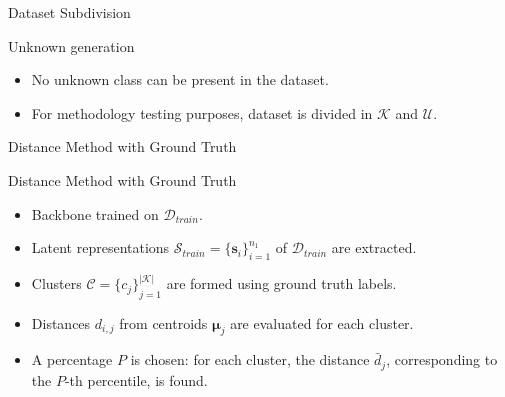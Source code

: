 \begin{frame}{Dataset Subdivision}
    \begin{normalblock}{Unknown generation}
        \begin{itemize}
          \item No unknown class can be present in the dataset.
          \item For methodology testing purposes, dataset is divided in $\mathcal{K}$ and $\mathcal{U}$.
        \end{itemize}
    \end{normalblock}

    \begin{table}
        \noindent
        \caption*{Subsets of the original dataset.}
    \end{table}
\end{frame}

\begin{frame}{Distance Method with Ground Truth}
    \begin{normalblock}{Distance Method with Ground Truth}
        \begin{itemize}
            \item Backbone trained on $\mathcal{D}_{train}$.
            \item Latent representations $\mathcal{S}_{train} = {\{\mathbf{s}_i\}}_{i=1}^{n_1}$ of $\mathcal{D}_{train}$ are extracted.
            \item Clusters $\mathcal{C} = {\{c_j\}}_{j=1}^{|\mathcal{K}|}$ are formed using ground truth labels.
            \item Distances $d_{i,j}$ from centroids $\mathbf{\mu}_j$ are evaluated for each cluster.
            \item A percentage $P$ is chosen: for each cluster, the distance $\bar{d}_j$, corresponding to the $P$-th percentile, is found.
        \end{itemize}
    \end{normalblock}
\end{frame}